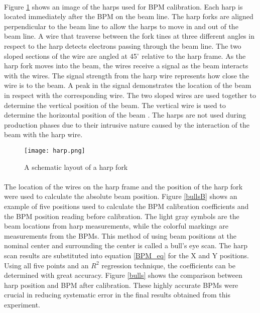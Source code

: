 \paragraph{} Figure \ref{harp} shows an image of the harps used for BPM calibration. Each harp is located immediately after the BPM on the beam line. The harp forks are aligned perpendicular to the beam line to allow the harps to move in and out of the beam line. A wire that traverse between the fork tines at three different angles in respect to the harp detects electrons passing through the beam line. The two sloped sections of the wire are angled at 45$^{\circ}$ relative to the harp frame. As the harp fork moves into the beam, the wires receive a signal as the beam interacts with the wires. The signal strength from the harp wire represents how close the wire is to the beam. A peak in the signal demonstrates the location of the beam in respect with the corresponding wire. The two sloped wires are used together to determine the vertical position of the beam. The vertical wire is used to determine the horizontal position of the beam \cite{BPM,BPM2}. The harps are not used during production phases due to their intrusive nature caused by the interaction of the beam with the harp wire.
		\begin{figure}[t]
			\centering
			\caption{A schematic layout of a harp fork \cite{BPM2} }
			\label{harp}
			\texttt{[image: harp.png]} 
		\end{figure}  	
		
		\paragraph{}The location of the wires on the harp frame and the position of the harp fork were used to calculate the absolute beam position. Figure \ref{bullsB} shows an example of five positions used to calculate the BPM calibration coefficients and the BPM position reading before calibration. The light gray symbols are the beam locations from harp measurements, while the colorful markings are measurements from the BPMs. This method of using beam positions at the nominal center and surrounding the center is called a bull's eye scan. The harp scan results are substituted into equation \ref{BPM_eq} for the X and Y positions. Using all five points and an $R^2$ regression technique, the coefficients can be determined with great accuracy. Figure \ref{bulls} shows the comparison between harp position and BPM after calibration. These highly accurate BPMs were crucial in reducing systematic error in the final results obtained from this experiment. 
